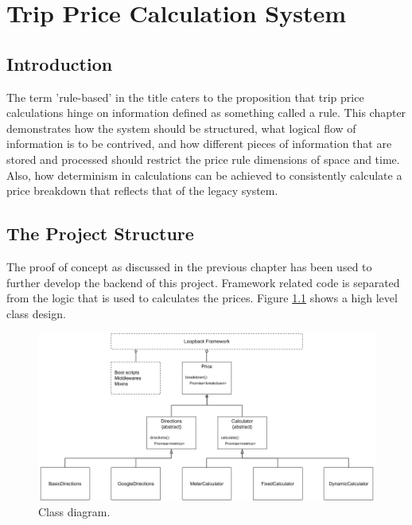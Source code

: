 \graphicspath{{Chapter4/Figs/Vector/}{Chapter4/Figs/}}

\chapter{Trip Price Calculation System}
\section{Introduction}
The term 'rule-based' in the title caters to the proposition that trip price calculations hinge on information defined as something called a rule. This chapter demonstrates how the system should be structured, what logical flow of information is to be contrived, and how different pieces of information that are stored and processed should restrict the price rule dimensions of space and time. Also, how determinism in calculations can be achieved to consistently calculate a price breakdown that reflects that of the legacy system.

\section{The Project Structure}
The proof of concept as discussed in the previous chapter has been used to further develop the backend of this project. Framework related code is separated from the logic that is used to calculates the prices. Figure \ref{fig:ClassDiagram} shows a high level class design.

\begin{figure}[H]
	\centering
	\includegraphics[width=1\textwidth]{ClassDiagram}
	\caption[Class Diagram]{Class diagram.}
	\label{fig:ClassDiagram}
\end{figure}

